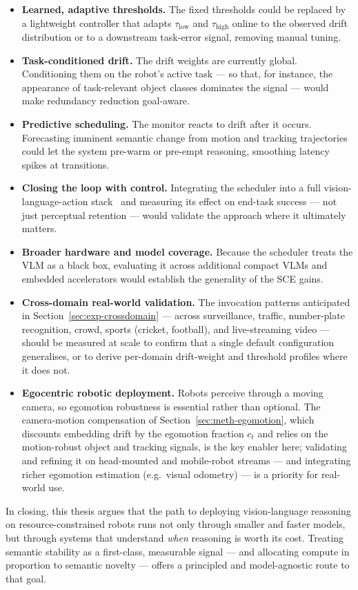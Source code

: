 \begin{itemize}
  \item \textbf{Learned, adaptive thresholds.} The fixed thresholds could be
  replaced by a lightweight controller that adapts $\tau_{\text{low}}$ and
  $\tau_{\text{high}}$ online to the observed drift distribution or to a
  downstream task-error signal, removing manual tuning.
  \item \textbf{Task-conditioned drift.} The drift weights are currently
  global. Conditioning them on the robot's active task --- so that, for
  instance, the appearance of task-relevant object classes dominates the
  signal --- would make redundancy reduction goal-aware.
  \item \textbf{Predictive scheduling.} The monitor reacts to drift after it
  occurs. Forecasting imminent semantic change from motion and tracking
  trajectories could let the system pre-warm or pre-empt reasoning, smoothing
  latency spikes at transitions.
  \item \textbf{Closing the loop with control.} Integrating the scheduler into
  a full vision-language-action stack~\cite{Kim2024OpenVLA} and measuring its
  effect on end-task success --- not just perceptual retention --- would validate
  the approach where it ultimately matters.
  \item \textbf{Broader hardware and model coverage.} Because the scheduler
  treats the VLM as a black box, evaluating it across additional compact VLMs
  and embedded accelerators would establish the generality of the SCE gains.
  \item \textbf{Cross-domain real-world validation.} The invocation patterns
  anticipated in Section~\ref{sec:exp-crossdomain} --- across surveillance,
  traffic, number-plate recognition, crowd, sports (cricket, football), and
  live-streaming video --- should be measured at scale to confirm that a single
  default configuration generalises, or to derive per-domain drift-weight and
  threshold profiles where it does not.
  \item \textbf{Egocentric robotic deployment.} Robots perceive through a
  moving camera, so egomotion robustness is essential rather than optional.
  The camera-motion compensation of Section~\ref{sec:meth-egomotion}, which
  discounts embedding drift by the egomotion fraction $c_t$ and relies on the
  motion-robust object and tracking signals, is the key enabler here;
  validating and refining it on head-mounted and mobile-robot streams --- and
  integrating richer egomotion estimation (e.g.\ visual odometry) --- is a
  priority for real-world use.
\end{itemize}

In closing, this thesis argues that the path to deploying vision-language
reasoning on resource-constrained robots runs not only through smaller and
faster models, but through systems that understand \emph{when} reasoning is
worth its cost. Treating semantic stability as a first-class, measurable
signal --- and allocating compute in proportion to semantic novelty --- offers a
principled and model-agnostic route to that goal.
